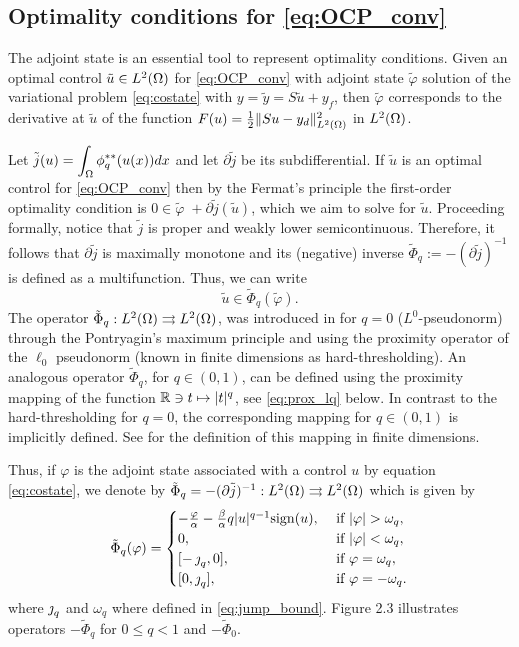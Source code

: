 \subsection{Optimality conditions for \eqref{eq:OCP_conv}} 

The adjoint state is an essential tool to represent optimality conditions. Given an optimal control 
$\tilde u \in L^2(\Omega)$ for \eqref{eq:OCP_conv} with adjoint state $\tilde \varphi$ solution of the variational 
problem \eqref{eq:costate} with $y=\tilde y = S \tilde u +y_f$, then $\tilde\varphi$ corresponds to the derivative at $\tilde u$ of the function $F(u) = \frac12 \lVert Su-y_d \rVert^2_{L^2(\Omega)}$ in $L^2(\Omega)$.

Let $\tilde j(u)= \displaystyle\int_\Omega \phi_q^{**}(u(x)) dx$ and let $\partial \tilde j$ be its 
subdifferential. If $\tilde{u}$ is an optimal control for \eqref{eq:OCP_conv} then by the Fermat’s principle 
the first-order optimality condition is
$0 \in \tilde{\varphi} \;+\partial \tilde{j} (\tilde{u})$, which we aim to solve for $\tilde{u}$. 
Proceeding formally, notice that $\tilde j$ is proper and weakly lower semicontinuous. Therefore, it 
follows that $\partial \tilde j$ is maximally monotone and its (negative) inverse $\tilde\Phi_q :=-(\partial \tilde j)^{-1}$ is defined as a multifunction. Thus, we can write
$$ \tilde u \in \tilde \Phi_q(\tilde \varphi).$$
The operator $\tilde \Phi_q: L^2(\Omega) \rightrightarrows L^2(\Omega) $, was introduced in \cite{ito-kunisch2014} 
for $q=0$ ($L^0$-pseudonorm) through the Pontryagin's maximum principle and using the proximity operator of 
the $\ell_0$ pseudonorm (known in finite dimensions as hard-thresholding). An analogous operator 
$\tilde \Phi_q$, for $q\in (0,1)$, can be defined using the proximity mapping of the function 
$\mathbb{R} \ni t \mapsto |t|^q$, see \eqref{eq:prox_lq} below. In contrast to the hard-thresholding for
 $q=0$, the corresponding mapping for $q \in (0,1)$ is implicitly defined.  See \cite{bredies2014} 
 for the definition of this mapping in finite dimensions. 

Thus, if $\varphi$ is the adjoint state associated with a control $u$ by equation \eqref{eq:costate}, we denote by $\tilde \Phi_q=-(\partial \tilde j)^{-1}:  L^2(\Omega) \rightrightarrows L^2(\Omega)$ which is given by 
%
\begin{equation}\label{eq:Phi_ext_convex}
		\tilde\Phi_q (\varphi)  =	
		\begin{cases}
			-\frac{\varphi}{\alpha}-\frac{\beta}{\alpha} q |u|^{q-1}\sign (u), & \text{ if } |\varphi|>\omega_q, \\
			0,                          &	 \text{ if } |\varphi|<\omega_q, \\
			[-\jump_q, 0] ,                         &	 \text{ if } \varphi=\omega_q,\\
			[0,\jump_q],                         &	 \text{ if } \varphi=-\omega_q.
		\end{cases}
	\end{equation}
    where $\operatorname{\jmath}_q$ and $\omega_q$ where defined in \eqref{eq:jump_bound}. Figure 2.3 illustrates operators 
	$-\tilde\Phi_q$ for $0\leq q<1$ and $-\tilde\Phi_0$. 

